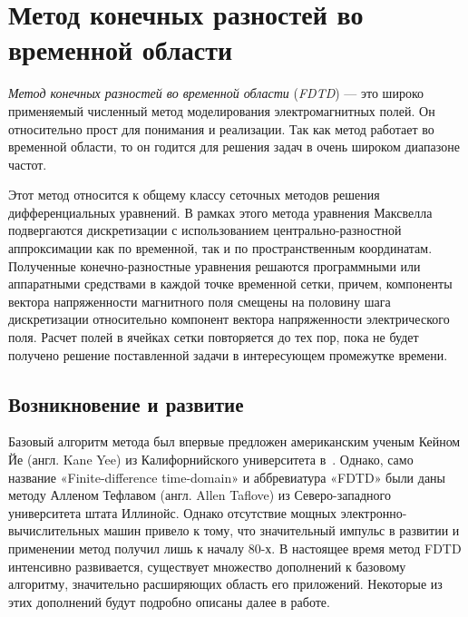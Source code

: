 \section{Метод конечных разностей во временной области}
\label{section:CoreMethod}

\emph{Метод конечных разностей во временной области} (\emph{FDTD}) --- это
широко применяемый численный метод моделирования электромагнитных полей. Он относительно
прост для понимания и реализации. Так как метод работает во временной области,
то он годится для решения задач в очень широком диапазоне частот.

Этот метод относится к общему классу сеточных методов решения дифференциальных
уравнений. В рамках этого метода уравнения Максвелла подвергаются дискретизации
с использованием центрально-разностной аппроксимации как по временной, так и по
пространственным координатам. Полученные конечно-разностные уравнения решаются
программными или аппаратными средствами в каждой точке временной сетки, причем,
компоненты вектора напряженности магнитного поля смещены на половину шага
дискретизации относительно компонент вектора напряженности электрического поля.
Расчет полей в ячейках сетки повторяется до тех пор, пока не будет получено
решение поставленной задачи в интересующем промежутке времени.


\subsection{Возникновение и развитие}

Базовый алгоритм метода был впервые предложен американским ученым Кейном Йе
(англ. Kane Yee) из Калифорнийского университета в~\cite{bib:Yee1966}. Однако,
само название «Finite-difference time-domain» и аббревиатура «FDTD» были даны
методу Алленом Тефлавом (англ. Allen Taflove) из Северо-западного университета
штата Иллинойс. Однако отсутствие мощных электронно-вычислительных машин привело
к тому, что
значительный импульс в развитии и применении метод получил лишь к началу 80-х.
В настоящее время метод FDTD интенсивно развивается, существует множество
дополнений к базовому алгоритму, значительно расширяющих область его приложений.
Некоторые из этих дополнений будут подробно описаны далее в работе.

